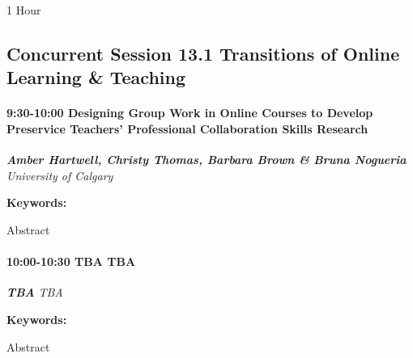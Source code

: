 \documentclass[
]{book}
\begin{document}
1 Hour

\hypertarget{concurrent-session-13.1-transitions-of-online-learning-teaching}{%
\subsection*{Concurrent Session 13.1 \textbar{} Transitions of Online Learning \& Teaching}\label{concurrent-session-13.1-transitions-of-online-learning-teaching}}

\begin{session}
\hypertarget{designing-group-work-in-online-courses-to-develop-preservice-teachers-professional-collaboration-skills-research}{%
\paragraph*{\texorpdfstring{9:30-10:00 \textbar{} \textbf{Designing
Group Work in Online Courses to Develop Preservice Teachers'
Professional Collaboration Skills} \textbar{}
Research}{9:30-10:00 \textbar{} Designing Group Work in Online Courses to Develop Preservice Teachers' Professional Collaboration Skills \textbar{} Research}}\label{designing-group-work-in-online-courses-to-develop-preservice-teachers-professional-collaboration-skills-research}}

\textbf{\emph{Amber Hartwell, Christy Thomas, Barbara Brown \& Bruna
Nogueria}} \textbar{} \emph{University of Calgary}

\textbf{Keywords:}

Abstract
\end{session}

\begin{session}
\hypertarget{tba-tba}{%
\paragraph*{\texorpdfstring{10:00-10:30 \textbar{} \textbf{TBA}
\textbar{}
TBA}{10:00-10:30 \textbar{} TBA \textbar{} TBA}}\label{tba-tba}}

\textbf{\emph{TBA}} \textbar{} \emph{TBA}

\textbf{Keywords:}

Abstract
\end{session}
\end{document}
